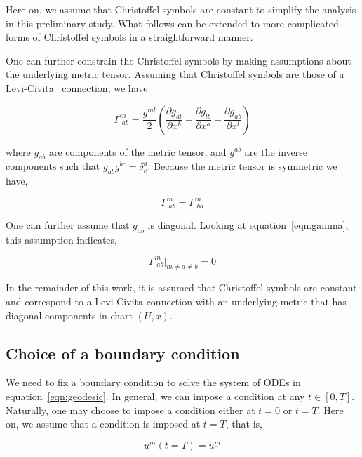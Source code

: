 \documentclass[a4paper,11pt]{elsarticle}
\begin{document}
Here on, we assume that Christoffel symbols are constant to simplify
the analysis in this preliminary study. What follows can be extended
to more complicated forms of Christoffel symbols in a straightforward
manner.

One can further constrain the Christoffel symbols by making assumptions
about the underlying metric tensor. Assuming that Christoffel symbols
are those of a Levi-Civita~\cite{deFelice:1990} connection, we have

\begin{equation}\label{eqn:gamma}
\Gamma^{m}_{\;ab} = \frac{g^{ml}}{2} ( \frac{\partial g_{al}}{\partial
  x^{b}} + \frac{\partial g_{lb}}{\partial x^{a}} - \frac{\partial
  g_{ab}}{\partial x^{l}} )
\end{equation}

where $g_{ab}$ are components of the metric tensor, and $g^{ab}$ are
the inverse components such that $g_{ab} g^{bc} =
\delta^{a}_{c}$. Because the metric tensor is symmetric we have,

\begin{equation}\label{eqn:gamma-symmetry}
\Gamma^{m}_{\;ab} = \Gamma^{m}_{\;ba}
\end{equation}

One can further assume that $g_{ab}$ is diagonal. Looking at
equation~\ref{eqn:gamma}, this assumption indicates,

\begin{equation}\label{eqn:gamma-diagonal-metric}
\Gamma^{m}_{\;ab}|_{m \ne a \ne b} = 0
\end{equation}

In the remainder of this work, it is assumed that Christoffel symbols
are constant and correspond to a Levi-Civita connection with an
underlying metric that has diagonal components in chart $(U, x)$.

\subsection{Choice of a boundary condition}
\label{subsection:boundary-conditions}

We need to fix a boundary condition to solve the system of ODEs in
equation~\ref{eqn:geodesic}. In general, we can impose a condition at
any $t \in [0,T]$. Naturally, one may choose to impose a condition either
at $t = 0$ or $t = T$. Here on, we assume that a condition is imposed
at $t = T$, that is,

\begin{equation}\label{eqn:geodesic-bc}
u^{m}(t = T) = u^{m}_{0}
\end{equation}
\end{document}
